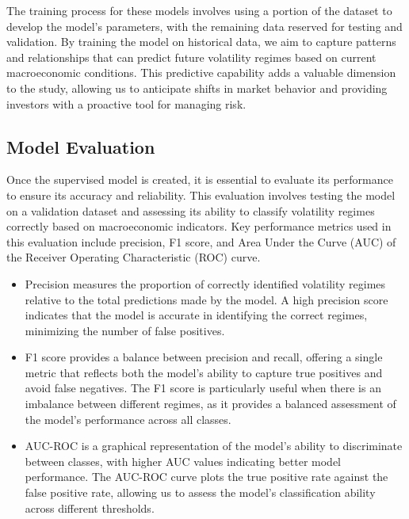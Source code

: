 The training process for these models involves using a portion of the dataset to develop the model’s parameters, with the remaining data reserved for testing and validation. By training the model on historical data, we aim to capture patterns and relationships that can predict future volatility regimes based on current macroeconomic conditions. This predictive capability adds a valuable dimension to the study, allowing us to anticipate shifts in market behavior and providing investors with a proactive tool for managing risk.

\subsection{Model Evaluation}

Once the supervised model is created, it is essential to evaluate its performance to ensure its accuracy and reliability. This evaluation involves testing the model on a validation dataset and assessing its ability to classify volatility regimes correctly based on macroeconomic indicators. Key performance metrics used in this evaluation include precision, F1 score, and Area Under the Curve (AUC) of the Receiver Operating Characteristic (ROC) curve.

\begin{itemize}

    \item Precision measures the proportion of correctly identified volatility regimes relative to the total predictions made by the model. A high precision score indicates that the model is accurate in identifying the correct regimes, minimizing the number of false positives.
    \item F1 score provides a balance between precision and recall, offering a single metric that reflects both the model’s ability to capture true positives and avoid false negatives. The F1 score is particularly useful when there is an imbalance between different regimes, as it provides a balanced assessment of the model’s performance across all classes.
    \item AUC-ROC is a graphical representation of the model’s ability to discriminate between classes, with higher AUC values indicating better model performance. The AUC-ROC curve plots the true positive rate against the false positive rate, allowing us to assess the model’s classification ability across different thresholds.

\end{itemize}

